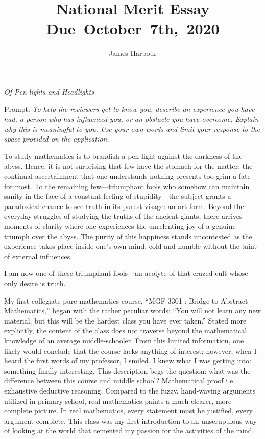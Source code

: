 \documentclass[12pt]{article}
\title{
    \vspace{2in}
    \textmd{\textbf{National Merit Essay}}\\
    \normalsize\vspace{0.1in}\small{Due\ October\ 7th,\ 2020}\\
    \vspace{3in}
}
\author{James Harbour}
\begin{document}
\maketitle
\pagebreak
 \begin{center}
   \emph{Of Pen lights and Headlights}
 \end{center}
 Prompt: \emph{To help the reviewers get to know you, describe an experience you have had, a person who has influenced you, or an obstacle you have overcome. Explain why this is meaningful to you. Use your own words and limit your response to the space provided on the application.}
\raggedright\setlength{\parindent}{0.5in}

To study mathematics is to brandish a pen light against the darkness of the abyss. Hence, it is not surprising that few have the stomach for the matter; the continual ascertainment that one understands nothing presents too grim a fate for most. To the remaining few---triumphant fools who somehow can maintain sanity in the face of a constant feeling of stupidity---the subject grants a paradoxical chance to see truth in its purest visage: an art form. Beyond the everyday struggles of studying the truths of the ancient giants, there arrives moments of clarity where one experiences the unrelenting joy of a genuine triumph over the abyss. The purity of this happiness stands uncontested as the experience takes place inside one's own mind, cold and humble without the taint of external influences.

I am now one of these triumphant fools---an acolyte of that crazed cult whose only desire is truth.

My first collegiate pure mathematics course, ``MGF 3301 : Bridge to Abstract Mathematics,'' began with the rather peculiar words: ``You will not learn any new material, but this will be the hardest class you have ever taken.'' Stated more explicitly, the content of the class does not traverse beyond the mathematical knowledge of an average middle-schooler. From this limited information, one likely would conclude that the course lacks anything of interest; however, when I heard the first words of my professor, I smiled. I knew what I was getting into: something finally interesting. This description begs the question: what was the difference between this course and middle school? Mathematical proof i.e. exhaustive deductive reasoning. Compared to the fuzzy, hand-waving arguments utilized in primary school, real mathematics paints a much clearer, more complete picture. In real mathematics, every statement must be justified, every argument complete. This class was my first introduction to an unscrupulous way of looking at the world that cemented my passion for the activities of the mind.
\end{document}
